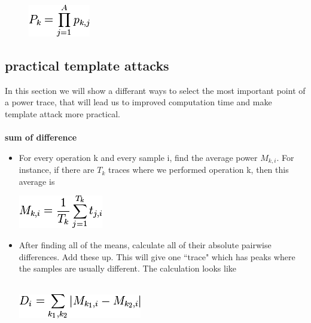     \begin{figure}[htp]
        \centering
        \includegraphics{images/Lecture_5/pic8.png}
       \end{figure}
    
    \subsection{practical template attacks}
    In this section we will show a differant ways to select the most important
    point of a power trace, that will lead us to improved computation time and
    make template attack more practical.\\
    \\
    \textbf{sum of difference}
       \begin{itemize}
          \item For every operation k and every sample i, find the average power
          $M_{k, i}$. For instance, if there are $T_k$ traces where we performed
          operation k, then this average is\\
              \begin{minipage}{\linewidth}
              \centering
              \includegraphics{images/Lecture_5/pic9.png}
              \end{minipage}
           
          \item After finding all of the means, calculate all of their absolute
          pairwise differences. Add these up. This will give one ``trace" which
          has peaks where the samples are usually different. The calculation
          looks like\\
          \\
              \begin{minipage}{\linewidth}
              \centering
              \includegraphics{images/Lecture_5/pic10.png}
              \end{minipage}
       \end{itemize}

